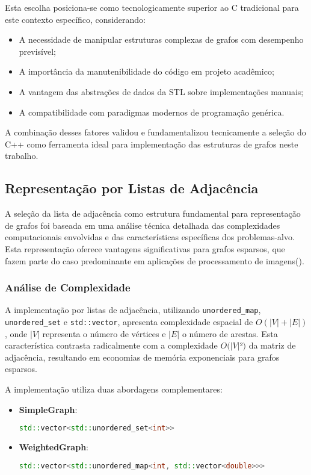 \documentclass{sbc2023}%
\begin{document}
Esta escolha posiciona-se como tecnologicamente superior ao C tradicional para este contexto específico, considerando:
\begin{itemize}
\item A necessidade de manipular estruturas complexas de grafos com desempenho previsível;
\item A importância da manutenibilidade do código em projeto acadêmico;
\item A vantagem das abstrações de dados da STL sobre implementações manuais;
\item A compatibilidade com paradigmas modernos de programação genérica.
\end{itemize}

A combinação desses fatores validou e fundamentalizou tecnicamente a seleção do C++ como ferramenta ideal para implementação das estruturas de grafos neste trabalho.

\subsection{Representação por Listas de Adjacência}

A seleção da lista de adjacência como estrutura fundamental para representação de grafos foi baseada em uma análise técnica detalhada das complexidades computacionais envolvidas e das características específicas dos problemas-alvo. Esta representação oferece vantagens significativas para grafos esparsos, que fazem parte do caso predominante em aplicações de processamento de imagens(\cite{boost-adjacency-list}).

\subsubsection{Análise de Complexidade}
A implementação por listas de adjacência, utilizando \texttt{unordered\_map}, \texttt{unordered\_set} e \texttt{std::vector}, apresenta complexidade espacial de \(O(|V| + |E|)\), onde \(|V|\) representa o número de vértices e \(|E|\) o número de arestas. Esta característica contrasta radicalmente com a complexidade \(O(|V|\)²\()\) da matriz de adjacência, resultando em economias de memória exponenciais para grafos esparsos.

A implementação utiliza duas abordagens complementares:
\begin{itemize}
    \item \textbf{SimpleGraph}: 
    \begin{lstlisting}[language=C++]
    std::vector<std::unordered_set<int>>
    \end{lstlisting}
    
    \item \textbf{WeightedGraph}: 
    \begin{lstlisting}[language=C++]
    std::vector<std::unordered_map<int, std::vector<double>>>
    \end{lstlisting}
\end{itemize}
\end{document}

